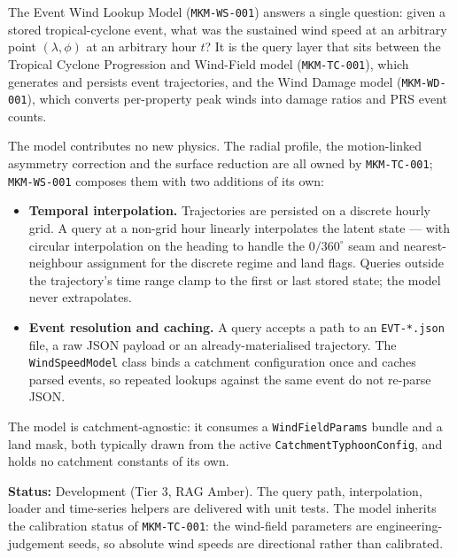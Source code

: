 \documentclass[11pt,a4paper]{article}
\begin{document}
\mkmtitlepage
\mkmlegalpage
\tableofcontents
\clearpage

\mkmexecsummary

The Event Wind Lookup Model (\texttt{MKM-WS-001}) answers a single question:
given a stored tropical-cyclone event, what was the sustained wind speed at an
arbitrary point $(\lambda, \phi)$ at an arbitrary hour $t$? It is the query
layer that sits between the Tropical Cyclone Progression and Wind-Field model
(\texttt{MKM-TC-001}), which generates and persists event trajectories, and the
Wind Damage model (\texttt{MKM-WD-001}), which converts per-property peak winds
into damage ratios and PRS event counts.

The model contributes no new physics. The radial profile, the motion-linked
asymmetry correction and the surface reduction are all owned by
\texttt{MKM-TC-001}; \texttt{MKM-WS-001} composes them with two additions of its
own:

\begin{itemize}
  \item \textbf{Temporal interpolation.} Trajectories are persisted on a
        discrete hourly grid. A query at a non-grid hour linearly interpolates
        the latent state --- with circular interpolation on the heading to
        handle the $0/360^\circ$ seam and nearest-neighbour assignment for the
        discrete regime and land flags. Queries outside the trajectory's time
        range clamp to the first or last stored state; the model never
        extrapolates.
  \item \textbf{Event resolution and caching.} A query accepts a path to an
        \texttt{EVT-*.json} file, a raw JSON payload or an already-materialised
        trajectory. The \texttt{WindSpeedModel} class binds a catchment
        configuration once and caches parsed events, so repeated lookups against
        the same event do not re-parse JSON.
\end{itemize}

The model is catchment-agnostic: it consumes a \texttt{WindFieldParams} bundle
and a land mask, both typically drawn from the active
\texttt{CatchmentTyphoonConfig}, and holds no catchment constants of its own.

\textbf{Status:} Development (Tier 3, RAG Amber). The query path, interpolation,
loader and time-series helpers are delivered with unit tests. The model
inherits the calibration status of \texttt{MKM-TC-001}: the wind-field
parameters are engineering-judgement seeds, so absolute wind speeds are
directional rather than calibrated.
\end{document}
